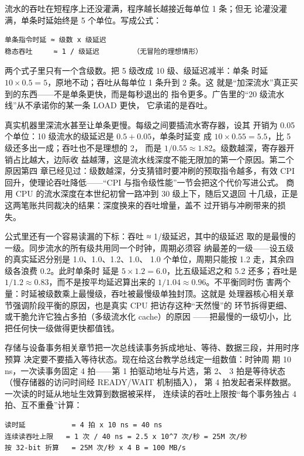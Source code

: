 流水的吞吐在短程序上还没灌满，程序越长越接近每单位 1 条；但无
论灌没灌满，单条时延始终是 5 个单位。写成公式：

\begin{lstlisting}
单条指令时延 ≈ 级数 x 级延迟
稳态吞吐     ≈ 1 / 级延迟        （无冒险的理想情形）
\end{lstlisting}

两个式子里只有一个含级数。把 5 级改成 10 级、级延迟减半：单条
时延 $10\times0.5=5$，原地不动；吞吐从每单位 1 条升到 2 条。这
就是“加深流水”真正买到的东西——不是单条更快，而是每秒退出的
指令更多。广告里的“20 级流水线”从不承诺你的某一条 LOAD 更快，
它承诺的是吞吐。

真实机器里深流水甚至让单条更慢。每级之间要插流水寄存器，设其
开销为 0.05 个单位：10 级流水的级延迟是 $0.5+0.05$，单条时延变
成 $10\times0.55=5.5$，比 5 级还多出一成；吞吐也不是理想的 2，
而是 $1/0.55\approx1.82$。级数越深，寄存器开销占比越大，边际收
益越薄，这是流水线深度不能无限加的第一个原因。第二个原因第四
章已经见过：级数越深，分支猜错时要冲刷的预取指令越多，有效
CPI 回升，使理论吞吐降低——“CPI 与指令级性能”一节会把这个代价写进公式。
商用 CPU 的流水深度在本世纪初曾一路冲到 30 级上下，随后又退回
十几级，正是这两笔账共同裁决的结果：深度换来的吞吐增量，盖不
过开销与冲刷带来的损失。

公式里还有一个容易读漏的下标：吞吐 ≈ 1/级延迟，其中的级延迟
取的是最慢的一级。同步流水的所有级共用同一个时钟，周期必须容
纳最差的一级——设五级的真实延迟分别是 1.0、1.0、1.2、1.0、
1.0 个单位，周期只能按 1.2 走，其余四级各浪费 0.2。此时单条时
延是 $5\times1.2=6.0$，比五级延迟之和 5.2 还多；吞吐是
$1/1.2\approx0.83$，而不是按平均延迟算出来的 $1/1.04\approx0.96$。不平衡同时伤
害两个量：时延被级数乘上最慢级，吞吐被最慢级单独封顶。这就是
处理器核心相关章节强调阶段平衡的原因，也是真实 CPU 把访存这种“天然慢”的
环节拆得更细、或干脆允许它独占多拍（多级流水化 cache）的原因
——把最慢的一级切小，比把任何快一级做得更快都值钱。

存储与设备事务相关章节把一次总线读事务拆成地址、等待、数据三段，并用时序预算
决定要不要插入等待状态。现在给这台教学总线定一组数值：时钟周
期 10 ns，一次读事务固定 4 拍——第 1 拍驱动地址与片选，第 2、
3 拍是等待状态（慢存储器的访问时间经 READY/WAIT 机制插入），
第 4 拍发起者采样数据。一次读的时延从地址生效算到数据被采样，
连续读的吞吐上限按“每个事务独占 4 拍、互不重叠”计算：

\begin{lstlisting}
读时延           = 4 拍 x 10 ns = 40 ns
连续读吞吐上限   = 1 次 / 40 ns = 2.5 x 10^7 次/秒 = 25M 次/秒
按 32-bit 折算   = 25M 次/秒 x 4 B = 100 MB/s
\end{lstlisting}

